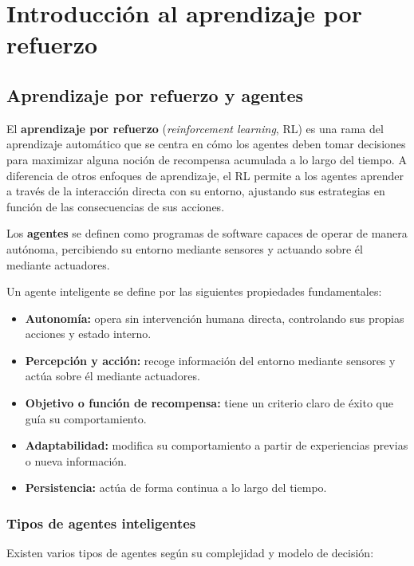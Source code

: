 \chapter{Introducción al aprendizaje por refuerzo}

\section{Aprendizaje por refuerzo y agentes}
El \textbf{aprendizaje por refuerzo} (\textit{reinforcement learning}, RL) es una rama del aprendizaje automático que se centra en cómo los agentes deben tomar decisiones para maximizar alguna noción de recompensa acumulada a lo largo del tiempo. A diferencia de otros enfoques de aprendizaje, el RL permite a los agentes aprender a través de la interacción directa con su entorno, ajustando sus estrategias en función de las consecuencias de sus acciones.

Los \textbf{agentes} se definen como programas de software capaces de operar de manera autónoma, percibiendo su entorno mediante sensores y actuando sobre él mediante actuadores.

Un agente inteligente se define por las siguientes propiedades fundamentales:

\begin{itemize}
    \item \textbf{Autonomía:} opera sin intervención humana directa, controlando sus propias acciones y estado interno.
    \item \textbf{Percepción y acción:} recoge información del entorno mediante sensores y actúa sobre él mediante actuadores.
    \item \textbf{Objetivo o función de recompensa:} tiene un criterio claro de éxito que guía su comportamiento.
    \item \textbf{Adaptabilidad:} modifica su comportamiento a partir de experiencias previas o nueva información.
    \item \textbf{Persistencia:} actúa de forma continua a lo largo del tiempo.
\end{itemize}

\subsection*{Tipos de agentes inteligentes}

Existen varios tipos de agentes según su complejidad y modelo de decisión:

